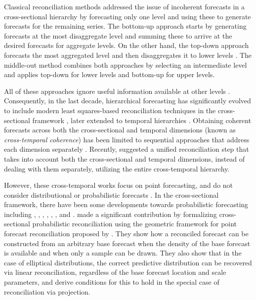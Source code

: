 \documentclass[12pt]{article}
\theoremstyle{definition}
\begin{document}
Classical reconciliation methods addressed the issue of incoherent forecasts in a cross-sectional hierarchy by forecasting only one level and using these to generate forecasts for the remaining series. The bottom-up approach \citep{dunn1976} starts by generating forecasts at the most disaggregate level and summing these to arrive at the desired forecasts for aggregate levels. On the other hand, the top-down approach \citep{gross1990} forecasts the most aggregated level and then disaggregates it to lower levels \citep{fliedner2001, athanasopoulos2009}. The middle-out method \citep{athanasopoulos2009} combines both approaches by selecting an intermediate level and applies top-down for lower levels and bottom-up for upper levels.

All of these approaches ignore useful information available at other levels \citep{pennings2017}. Consequently, in the last decade, hierarchical forecasting has significantly evolved to include modern least squares-based reconciliation techniques in the cross-sectional framework \citep{hyndman2011, wickramasuriya2019, panagiotelis2021}, later extended to temporal hierarchies \citep{athanasopoulos2017, nystrup2020}. Obtaining coherent forecasts across both the cross-sectional and temporal dimensions (known as \textit{cross-temporal coherence}) has been limited to sequential approaches that address each dimension separately \citep{kourentzes2019, yagli2019, punia2020, spiliotis2020}. Recently, \citet{difonzo2023} suggested a unified reconciliation step that takes into account both the cross-sectional and temporal dimensions, instead of dealing with them separately, utilizing the entire cross-temporal hierarchy.

However, these cross-temporal works focus on point forecasting, and do not consider distributional or probabilistic forecasts \citep{gneiting2014}. In the cross-sectional framework, there have been some developments towards probabilistic forecasting including  \cite{bentaieb2017}, \cite{panamtash2018}, \cite{jeon2019}, \cite{bentaieb2021}, \cite{corani2021}, \cite{corani2022}, \cite{zambon2022} and \cite{wickramasuriya2021b}. \cite{panagiotelis2023} made a significant contribution by formalizing cross-sectional probabilistic reconciliation using the geometric framework for point forecast reconciliation proposed by \cite{panagiotelis2021}. They show how a reconciled forecast can be constructed from an arbitrary base forecast when the density of the base forecast is available and when only a sample can be drawn. They also show that in the case of elliptical distributions, the correct predictive distribution can be recovered via linear reconciliation, regardless of the base forecast location and scale parameters, and derive conditions for this to hold in the special case of reconciliation via projection.
\end{document}
